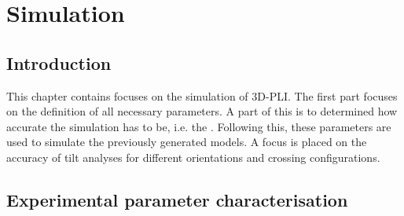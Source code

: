 \setcounter{chapter}{7}
\chapter{Simulation}
\label{cha:simulation_analysis}
% 
% 
\section{Introduction}
% 
This chapter contains focuses on the simulation of \ac{3D-PLI}.
The first part focuses on the definition of all necessary parameters.
A part of this is to determined how accurate the simulation has to be, i.e. the \voxelsize{}.
Following this, these parameters are used to simulate the previously generated models.
A focus is placed on the accuracy of tilt analyses for different orientations and crossing configurations.
% 
% 
% 
\section{Experimental parameter characterisation}\label{sec:sim_choose_parameters}
% 
